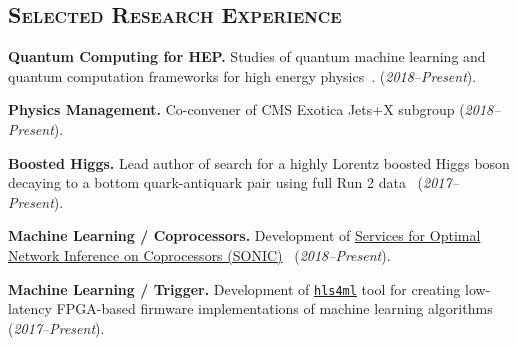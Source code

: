 \documentclass[11pt]{res}
\newcommand{\MarginText}[1]{\section{\textsc{#1}}\vspace{10pt}}
\begin{document}
\begin{resume}

\MarginText{Selected Research Experience}

\textbf{Quantum Computing for HEP.} Studies of quantum machine learning and
quantum computation frameworks for high energy physics~\cite{Zlokapa:2019tkn}.
(\textit{2018--Present}).

\textbf{Physics Management.} Co-convener of CMS Exotica Jets+X subgroup
(\textit{2018--Present}).

\textbf{Boosted Higgs.} Lead author of search for a highly Lorentz boosted Higgs boson
  decaying to a bottom quark-antiquark pair using full Run 2 data~\cite{CMS-HIG-19-003} (\textit{2017--Present}).

\textbf{Machine Learning / Coprocessors.} Development of \href{https://github.com/hls-fpga-machine-learning/SonicCMS}{Services for Optimal Network Inference on Coprocessors (SONIC)}~\cite{neurips2019_sonic,Duarte:2019fta} (\textit{2018--Present}).

\textbf{Machine Learning / Trigger.} Development of
\href{https://fastmachinelearning.org/hls4ml/}{\texttt{hls4ml}}
tool for creating low-latency FPGA-based firmware
  implementations of machine learning algorithms~\cite{bnnpaper,Summers:2020xiy,neurips2019_hls4ml,Duarte:2018ite} (\textit{2017--Present}).


\end{resume}
\end{document}
